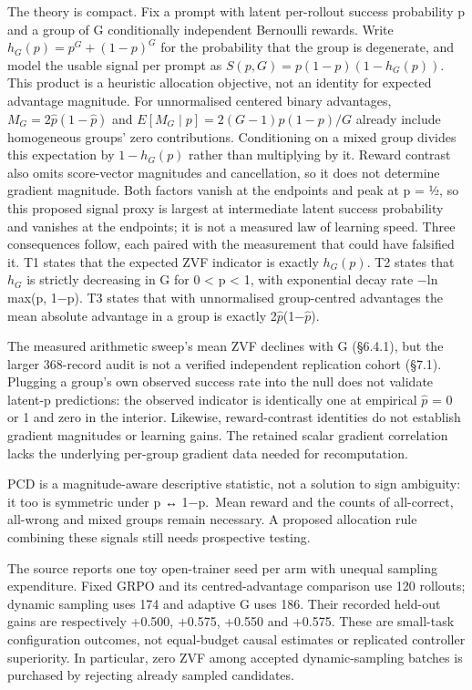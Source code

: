 \documentclass[12pt,a4paper]{report}
\begin{document}
The theory is compact. Fix a prompt with latent per-rollout success
probability p and a group of G conditionally independent Bernoulli
rewards. Write \(h_G(p) = p^G + (1-p)^G\) for the probability that the
group is degenerate, and model the usable signal per prompt as
\(S(p,G) = p(1-p)(1-h_G(p))\). This product is a heuristic allocation
objective, not an identity for expected advantage magnitude. For
unnormalised centered binary advantages, \(M_G=2\hat p(1-\hat p)\) and
\(E[M_G\mid p]=2(G-1)p(1-p)/G\) already include homogeneous groups' zero
contributions. Conditioning on a mixed group divides this expectation by
\(1-h_G(p)\) rather than multiplying by it. Reward contrast also omits
score-vector magnitudes and cancellation, so it does not determine
gradient magnitude. Both factors vanish at the endpoints and peak at p =
½, so this proposed signal proxy is largest at intermediate latent
success probability and vanishes at the endpoints; it is not a measured
law of learning speed. Three consequences follow, each paired with the
measurement that could have falsified it. T1 states that the expected
ZVF indicator is exactly \(h_G(p)\). T2 states that \(h_G\) is strictly
decreasing in G for 0 \textless{} p \textless{} 1, with exponential
decay rate −ln max(p, 1−p). T3 states that with unnormalised
group-centred advantages the mean absolute advantage in a group is
exactly 2\ensuremath{\hat{p}}(1−\ensuremath{\hat{p}}).

The measured arithmetic sweep's mean ZVF declines with G (§6.4.1), but
the larger 368-record audit is not a verified independent replication
cohort (§7.1). Plugging a group's own observed success rate into the
null does not validate latent-p predictions: the observed indicator is
identically one at empirical \ensuremath{\hat{p}} = 0 or 1 and zero in the interior.
Likewise, reward-contrast identities do not establish gradient
magnitudes or learning gains. The retained scalar gradient correlation
lacks the underlying per-group gradient data needed for recomputation.

PCD is a magnitude-aware descriptive statistic, not a solution to sign
ambiguity: it too is symmetric under p ↔ 1−p.~Mean reward and the counts
of all-correct, all-wrong and mixed groups remain necessary. A proposed
allocation rule combining these signals still needs prospective testing.

The source reports one toy open-trainer seed per arm with unequal
sampling expenditure. Fixed GRPO and its centred-advantage comparison
use 120 rollouts; dynamic sampling uses 174 and adaptive G uses 186.
Their recorded held-out gains are respectively +0.500, +0.575, +0.550
and +0.575. These are small-task configuration outcomes, not
equal-budget causal estimates or replicated controller superiority. In
particular, zero ZVF among accepted dynamic-sampling batches is
purchased by rejecting already sampled candidates.
\end{document}
